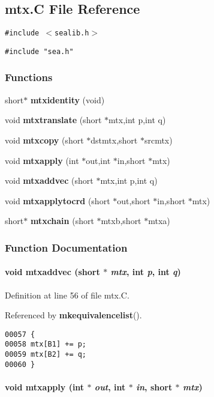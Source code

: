 \subsection{mtx.C File Reference}
\label{mtx.C}
{\tt \#include $<$sealib.h$>$}\par
{\tt \#include "sea.h"}\par
\subsubsection*{Functions}
\begin{CompactItemize}
\item 
short$\ast$ {\bf mtxidentity} (void)
\item 
void {\bf mtxtranslate} (short $\ast$mtx,int p,int q)
\item 
void {\bf mtxcopy} (short $\ast$dstmtx,short $\ast$srcmtx)
\item 
void {\bf mtxapply} (int $\ast$out,int $\ast$in,short $\ast$mtx)
\item 
void {\bf mtxaddvec} (short $\ast$mtx,int p,int q)
\item 
void {\bf mtxapplytocrd} (short $\ast$out,short $\ast$in,short $\ast$mtx)
\item 
short$\ast$ {\bf mtxchain} (short $\ast$mtxb,short $\ast$mtxa)
\end{CompactItemize}


\subsubsection{Function Documentation}
\label{mtx.C_a4}
\paragraph{\setlength{\rightskip}{0pt plus 5cm}void mtxaddvec (short $\ast$ {\em mtx}, int {\em p}, int {\em q})}\hfill



Definition at line 56 of file mtx.C.

Referenced by {\bf mkequivalencelist}().\small\begin{verbatim}00057 {
00058 mtx[B1] += p;
00059 mtx[B2] += q;
00060 }
\end{verbatim}\normalsize 
\label{mtx.C_a3}
\paragraph{\setlength{\rightskip}{0pt plus 5cm}void mtxapply (int $\ast$ {\em out}, int $\ast$ {\em in}, short $\ast$ {\em mtx})}\hfill



